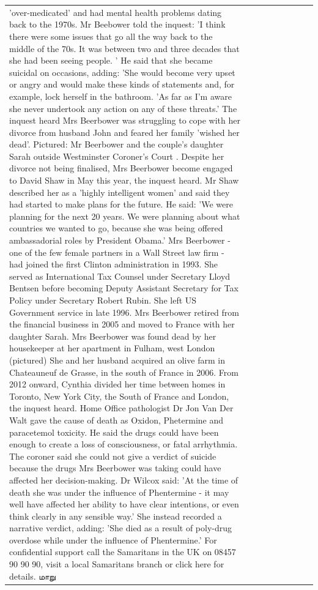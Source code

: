 \begin{table}[H]
\begin{tabular}{lllrlllll}
'over-medicated' and had mental health problems dating back to the 1970s. Mr Beebower told the inquest: 'I think there were some issues that go all the way back to the middle of the 70s. It was between two and three decades that she had been seeing people. ' He said that she became suicidal on occasions, adding: 'She would become very upset or angry and would make these kinds of statements and, for example, lock herself in the bathroom. 'As far as I'm aware she never undertook any action on any of these threats.' The inquest heard Mrs Beerbower was struggling to cope with her divorce from husband John and feared her family 'wished her dead'. Pictured: Mr Beerbower and the couple's daughter Sarah outside Westminster Coroner's Court . Despite her divorce not being finalised, Mrs Beerbower become engaged to David Shaw in May this year, the inquest heard. Mr Shaw described her as a 'highly intelligent women' and said they had started to make plans for the future. He said: 'We were planning for the next 20 years. We were planning about what countries we wanted to go, because she was being offered ambassadorial roles by President Obama.' Mrs Beerbower - one of the few female partners in a Wall Street law firm - had joined the first Clinton administration in 1993. She served as International Tax Counsel under Secretary Lloyd Bentsen before becoming Deputy Assistant Secretary for Tax Policy under Secretary Robert Rubin. She left US Government service in late 1996. Mrs Beerbower retired from the financial business in 2005 and moved to France with her daughter Sarah. Mrs Beerbower was found dead by her housekeeper at her apartment in Fulham, west London (pictured) She and her husband acquired an olive farm in Chateauneuf de Grasse, in the south of France in 2006. From 2012 onward, Cynthia divided her time between homes in Toronto, New York City, the South of France and London, the inquest heard. Home Office pathologist Dr Jon Van Der Walt gave the cause of death as Oxidon, Phetermine and paracetemol toxicity. He said the drugs could have been enough to create a loss of consciousness, or fatal arrhythmia. The coroner said she could not give a verdict of suicide because the drugs Mrs Beerbower was taking could have affected her decision-making. Dr Wilcox said: 'At the time of death she was under the influence of Phentermine - it may well have affected her ability to have clear intentions, or even think clearly in any sensible way.' She instead recorded a narrative verdict, adding: 'She died as a result of poly-drug overdose while under the influence of Phentermine.' For confidential support call the Samaritans in the UK on 08457 90 90 90, visit a local Samaritans branch or click here for details. மாறு \\

\end{tabular}
\end{table}
